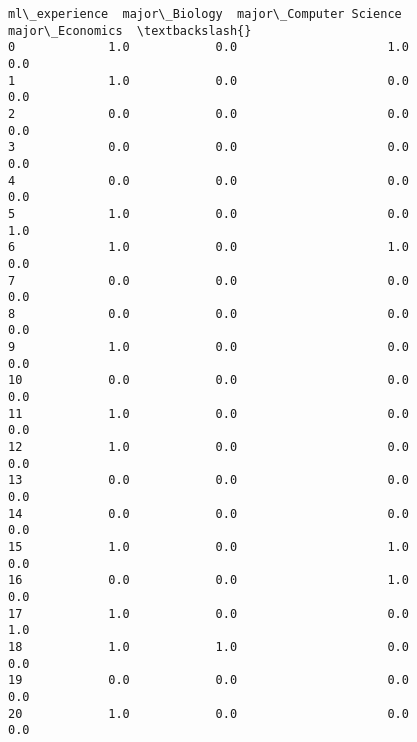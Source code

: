 \documentclass[11pt]{article}
\begin{document}
\begin{tcolorbox}[breakable, size=fbox, boxrule=.5pt, pad at break*=1mm, opacityfill=0]
\begin{Verbatim}[commandchars=\\\{\}]
    ml\_experience  major\_Biology  major\_Computer Science  major\_Economics  \textbackslash{}
0             1.0            0.0                     1.0              0.0
1             1.0            0.0                     0.0              0.0
2             0.0            0.0                     0.0              0.0
3             0.0            0.0                     0.0              0.0
4             0.0            0.0                     0.0              0.0
5             1.0            0.0                     0.0              1.0
6             1.0            0.0                     1.0              0.0
7             0.0            0.0                     0.0              0.0
8             0.0            0.0                     0.0              0.0
9             1.0            0.0                     0.0              0.0
10            0.0            0.0                     0.0              0.0
11            1.0            0.0                     0.0              0.0
12            1.0            0.0                     0.0              0.0
13            0.0            0.0                     0.0              0.0
14            0.0            0.0                     0.0              0.0
15            1.0            0.0                     1.0              0.0
16            0.0            0.0                     1.0              0.0
17            1.0            0.0                     0.0              1.0
18            1.0            1.0                     0.0              0.0
19            0.0            0.0                     0.0              0.0
20            1.0            0.0                     0.0              0.0


\end{Verbatim}
\end{tcolorbox}
\end{document}
